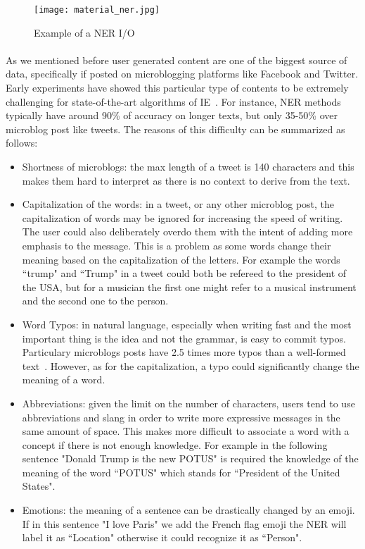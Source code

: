 \begin{figure}[ht]
\texttt{[image: material\_ner.jpg]}
\caption{Example of a NER I/O}
\label{fig:ner_io}
\end{figure}
\vspace{-10pt}

\paragraph{}
As we mentioned before user generated content are one of the biggest source of data, specifically if posted on microblogging platforms like Facebook and Twitter. Early experiments have showed this particular type of contents to be extremely challenging for state-of-the-art algorithms of IE~\cite{derczynski2013microblog}. For instance, NER methods typically have around 90\% of accuracy on longer texts, but only 35-50\% over microblog post like tweets. The reasons of this difficulty can be summarized as follows:

\begin{itemize}[itemsep = 0.1em]
\item Shortness of microblogs: the max length of a tweet is 140 characters and this makes them hard to interpret as there is no context to derive from the text.

\item Capitalization of the words: in a tweet, or any other microblog post, the capitalization of words may be ignored for increasing the speed of writing. The user could also deliberately overdo them with the intent of adding more emphasis to the message. This is a problem as some words change their meaning based on the capitalization of the letters. For example the words ``trump" and ``Trump" in a tweet could both be refereed to the president of the USA, but for a musician the first one might refer to a musical instrument and the second one to the person.

\item Word Typos: in natural language, especially when writing fast and the most important thing is the idea and not the grammar, is easy to commit typos. Particulary microblogs posts have 2.5 times more typos than a well-formed text~\cite{derczynski2015analysis}. However, as for the capitalization, a typo could significantly change the meaning of a word.

\item Abbreviations: given the limit on the number of characters, users tend to use abbreviations and slang in order to write more expressive messages in the same amount of space. This makes more difficult to associate a word with a concept if there is not enough knowledge. For example in the following sentence "Donald Trump is the new POTUS" is required the knowledge of the meaning of the word ``POTUS" which stands for ``President of the United States".

\item Emotions: the meaning of a sentence can be drastically changed by an emoji. If in this sentence "I love Paris" we add the French flag emoji the NER will label it as ``Location" otherwise it could recognize it as ``Person".
\end{itemize}

